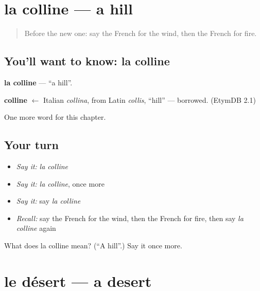 \section[la colline]{la colline — a hill}

\label{lesson:FR-C84-colline}



\begin{quote}
Before the new one: say the French for the wind, then the French for fire.
\end{quote}

\subsection*{You'll want to know: la colline}
\textbf{la colline} — \textquotedblleft{}a hill\textquotedblright{}.

\begin{cousinweb}
\textbf{colline} $\leftarrow$ Italian \emph{collina}, from Latin \emph{collis}, \textquotedblleft{}hill\textquotedblright{} — borrowed. (EtymDB 2.1)
\end{cousinweb}

\begin{grammarlens}[title={What you've built}]
One more word for this chapter.
\end{grammarlens}

\subsection*{Your turn}
\begin{itemize}
\raggedright
  \item \emph{Say it:} \emph{la colline}
  \item \emph{Say it:} \emph{la colline}, once more
  \item \emph{Say it:} say \emph{la colline}
  \item \emph{Recall:} say the French for the wind, then the French for fire, then say \emph{la colline} again
\end{itemize}

\begin{tcolorbox}[breakable,colback=teal!4,colframe=teal!35!black,title={Before you move on}]
What does la colline mean? (\textquotedblleft{}A hill\textquotedblright{}.) Say it once more.
\end{tcolorbox}
\section[le désert]{le désert — a desert}

